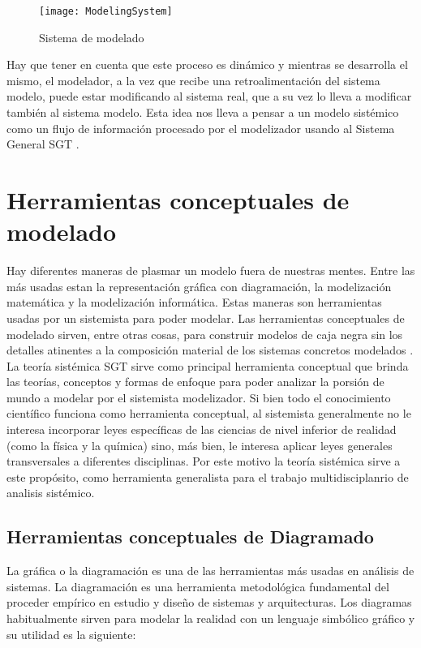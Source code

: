 \begin{figure}[h]
  \centering
  \texttt{[image: ModelingSystem]}
  \caption{Sistema de modelado}
  \centering
  \label{fig:ModelingSystem} %
\end{figure}

Hay que tener en cuenta que este proceso es dinámico y mientras se desarrolla el mismo, el modelador, a la vez que recibe una retroalimentación del sistema modelo, puede estar modificando al sistema real, que a su vez lo lleva a modificar también al sistema modelo. Esta idea nos lleva a pensar a un modelo sistémico como un flujo de información procesado por el modelizador usando al Sistema General SGT \cite{Sarabia-1995}.

\section{Herramientas conceptuales de modelado}

Hay diferentes maneras de plasmar un modelo fuera de nuestras mentes. Entre las más usadas estan la representación gráfica con diagramación, la modelización matemática y la modelización informática. Estas maneras son herramientas usadas por un sistemista para poder modelar. Las herramientas conceptuales de modelado sirven, entre otras cosas, para construir modelos de caja negra sin los detalles atinentes a la composición material de los sistemas concretos modelados \cite{Bunge-1979}. La teoría sistémica SGT sirve como principal herramienta conceptual que brinda las teorías, conceptos y formas de enfoque para poder analizar la porsión de mundo a modelar por el sistemista modelizador. Si bien todo el conocimiento científico funciona como herramienta conceptual, al sistemista generalmente no le interesa incorporar leyes específicas de las ciencias de nivel inferior de realidad (como la física y la química) sino, más bien, le interesa aplicar leyes generales transversales a diferentes disciplinas. Por este motivo la teoría sistémica sirve a este propósito, como herramienta generalista para el trabajo multidisciplanrio de analisis sistémico.

\subsection{Herramientas conceptuales de Diagramado}

La gráfica o la diagramación es una de las herramientas más usadas en análisis de sistemas. La diagramación es una herramienta metodológica fundamental del proceder empírico en estudio y diseño de sistemas y arquitecturas. Los diagramas habitualmente sirven para modelar la realidad con un lenguaje simbólico gráfico y su utilidad es la siguiente:

